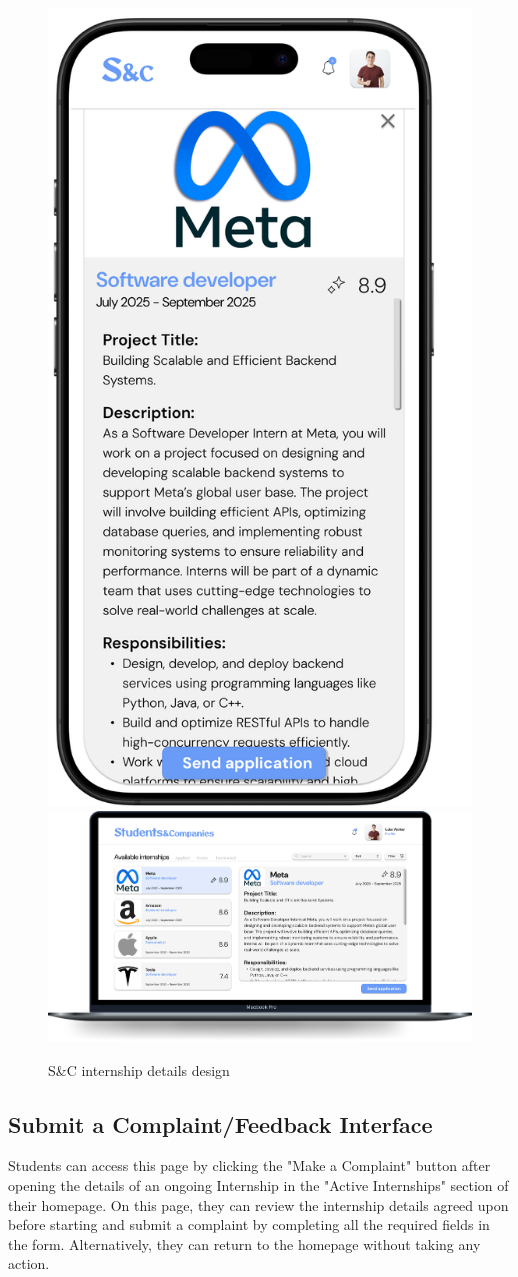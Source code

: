 \begin{figure}[H]
    \centering
    \includegraphics[width=0.2\linewidth]{Images/Mock-up/mobile nternship details.png}
    \includegraphics[width=0.75\linewidth]{Images/Mock-up/internship details.png}
    \caption{S\&C internship details design}
    \label{fig:homepage-design}
\end{figure}

\subsection{Submit a Complaint/Feedback Interface}

Students can access this page by clicking the "Make a Complaint" button after opening the details of an ongoing Internship in the "Active Internships" section of their homepage. On this page, they can review the internship details agreed upon before starting and submit a complaint by completing all the required fields in the form. Alternatively, they can return to the homepage without taking any action. \\

